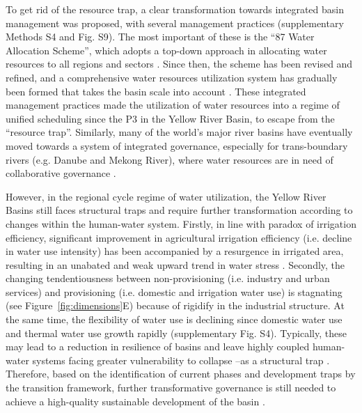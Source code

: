 \documentclass[9pt, twocolumn, twoside, lineno]{pnas-new}
\begin{document}
To get rid of the resource trap, a clear transformation towards integrated basin management was proposed, with several management practices (supplementary Methods S4 and Fig. S9). The most important of these is the “87 Water Allocation Scheme”, which adopts a top-down approach in allocating water resources to all regions and sectors \cite{wangThirtyYearsYellow2018}. Since then, the scheme has been revised and refined, and a comprehensive water resources utilization system has gradually been formed that takes the basin scale into account \cite{wangThirtyYearsYellow2018}. These integrated management practices made the utilization of water resources into a regime of unified scheduling since the P3 in the Yellow River Basin, to escape from the “resource trap”. Similarly, many of the world's major river basins have eventually moved towards a system of integrated governance, especially for trans-boundary rivers (e.g. Danube and Mekong River), where water resources are in need of collaborative governance \cite{bodinCollaborativeEnvironmentalGovernance2017a}.


However, in the regional cycle regime of water utilization, the Yellow River Basins still faces structural traps and require further transformation according to changes within the human-water system. 
Firstly, in line with paradox of irrigation efficiency, significant improvement in agricultural irrigation efficiency (i.e. decline in water use intensity) has been accompanied by a resurgence in irrigated area, resulting in an unabated and weak upward trend in water stress \cite{graftonParadoxIrrigationEfficiency2018}.
Secondly, the changing tendentiousness between non-provisioning (i.e. industry and urban services) and provisioning (i.e. domestic and irrigation water use) is stagnating (see Figure~\ref{fig:dimensions}E) because of rigidify in the industrial structure. 
At the same time, the flexibility of water use is declining since domestic water use and thermal water use growth rapidly (supplementary Fig. S4). 
Typically, these may lead to a reduction in resilience of basins and leave highly coupled human-water systems facing greater vulnerability to collapse --as a structural trap \cite{cummingResilienceBigRiver2011}. Therefore, based on the identification of current phases and development traps by the transition framework, further transformative governance is still needed to achieve a high-quality sustainable development of the basin \cite{scoonesTransformationsSustainabilityCombining2020a}.
\end{document}
